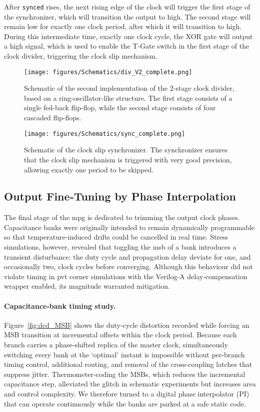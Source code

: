 After \texttt{synced} rises, the next rising edge of the clock will trigger the first stage of the synchronizer, which will transition the output to high. The second stage will remain low for exactly one clock period, after which it will transition to high. During this intermediate time, exactly one clock cycle, the XOR gate will output a high signal, which is used to enable the T-Gate switch in the first stage of the clock divider, triggering the clock slip mechanism.
\begin{figure}[h]
  \centering
  \texttt{[image: figures/Schematics/div\_V2\_complete.png]}
  \caption{Schematic of the second implementation of the 2-stage clock divider, based on a ring-oscillator-like structure. The first stage consists of a single fed-back flip-flop, while the second stage consists of four cascaded flip-flops.}
  \label{fig:div_V2_complete}
\end{figure}
\begin{figure}[h]
  \centering
  \texttt{[image: figures/Schematics/sync\_complete.png]}
  \caption{Schematic of the clock slip synchronizer. The synchronizer ensures that the clock slip mechanism is triggered with very good precision, allowing exactly one period to be skipped.}
  \label{fig:sync}
\end{figure}
\subsection{Output Fine‑Tuning by Phase Interpolation}\label{sec:output_finetuning}
The final stage of the \gls{mpg} is dedicated to trimming the output clock phases. Capacitance banks were originally intended to remain dynamically programmable so that temperature‑induced drifts could be cancelled in real time. Stress simulations, however, revealed that toggling the \gls{msb} of a bank introduces a transient disturbance: the duty cycle and propagation delay deviate for one, and occasionally two, clock cycles before converging. Although this behaviour did not violate timing in \gls{pvt} corner simulations with the Verilog‑A delay‑compensation wrapper enabled, its magnitude warranted mitigation.
\paragraph{Capacitance‑bank timing study.} Figure~\ref{fig:dcd_MSB} shows the duty‑cycle distortion recorded while forcing an MSB transition at incremental offsets within the clock period. Because each branch carries a phase‑shifted replica of the master clock, simultaneously switching every bank at the ‘optimal’ instant is impossible without per‑branch timing control, additional routing, and removal of the cross‑coupling latches that suppress jitter. Thermometer‑coding the MSBs, which reduces the incremental capacitance step, alleviated the glitch in schematic experiments but increases area and control complexity. We therefore turned to a digital phase interpolator (PI) that can operate continuously while the banks are parked at a safe static code.
